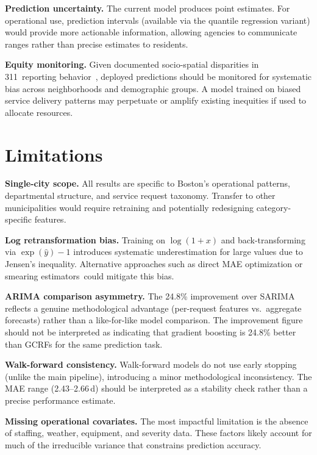 \documentclass[sigconf,nonacm]{acmart}
\begin{document}
\textbf{Prediction uncertainty.} The current model produces point
estimates. For operational use, prediction intervals
(available via the quantile regression variant) would provide
more actionable information, allowing agencies to communicate
ranges rather than precise estimates to residents.

\textbf{Equity monitoring.} Given documented socio-spatial
disparities in 311~reporting behavior~\cite{kontokosta2021bias},
deployed predictions should be monitored for systematic bias
across neighborhoods and demographic groups. A model trained on
biased service delivery patterns may perpetuate or amplify
existing inequities if used to allocate resources.

\section{Limitations}
\label{sec:limitations}

\textbf{Single-city scope.} All results are specific to Boston's
operational patterns, departmental structure, and service request
taxonomy. Transfer to other municipalities would require
retraining and potentially redesigning category-specific features.

\textbf{Log retransformation bias.} Training on $\log(1+x)$ and
back-transforming via $\exp(\hat{y})-1$ introduces systematic
underestimation for large values due to Jensen's
inequality. Alternative approaches such as direct MAE
optimization or smearing estimators~could mitigate this bias.

\textbf{ARIMA comparison asymmetry.} The 24.8\% improvement over
SARIMA reflects a genuine methodological advantage (per-request
features vs.\ aggregate forecasts) rather than a like-for-like
model comparison. The improvement figure should not be
interpreted as indicating that gradient boosting is 24.8\% better
than GCRFs for the same prediction task.

\textbf{Walk-forward consistency.} Walk-forward models do not use
early stopping (unlike the main pipeline), introducing a minor
methodological inconsistency. The MAE range (2.43--2.66\,d)
should be interpreted as a stability check rather than a precise
performance estimate.

\textbf{Missing operational covariates.} The most impactful
limitation is the absence of staffing, weather, equipment, and
severity data. These factors likely account for much of the
irreducible variance that constrains prediction accuracy.
\end{document}
